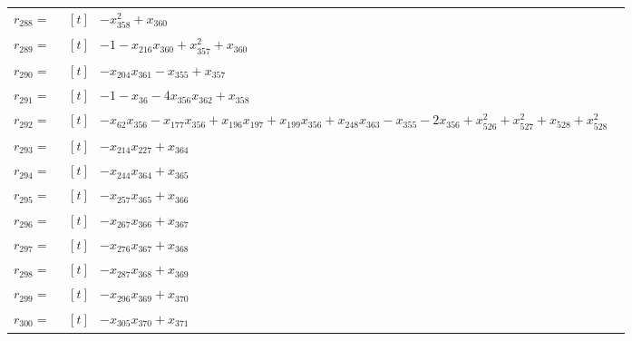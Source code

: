 \begin{longtable}{@{}r p{0.92\linewidth}@{}}
$r_{288}=$ & $\begin{aligned}[t]&-x_{358}^{2}+x_{360}\end{aligned}$ \\[2pt]
$r_{289}=$ & $\begin{aligned}[t]&-1-x_{216}x_{360}+x_{357}^{2}+x_{360}\end{aligned}$ \\[2pt]
$r_{290}=$ & $\begin{aligned}[t]&-x_{204}x_{361}-x_{355}+x_{357}\end{aligned}$ \\[2pt]
$r_{291}=$ & $\begin{aligned}[t]&-1-x_{36}-4x_{356}x_{362}+x_{358}\end{aligned}$ \\[2pt]
$r_{292}=$ & $\begin{aligned}[t]&-x_{62}x_{356}-x_{177}x_{356}+x_{196}x_{197}+x_{199}x_{356}+x_{248}x_{363}-x_{355}-2x_{356}+x_{526}^{2}+x_{527}^{2}+x_{528}+x_{528}^{2}\end{aligned}$ \\[2pt]
$r_{293}=$ & $\begin{aligned}[t]&-x_{214}x_{227}+x_{364}\end{aligned}$ \\[2pt]
$r_{294}=$ & $\begin{aligned}[t]&-x_{244}x_{364}+x_{365}\end{aligned}$ \\[2pt]
$r_{295}=$ & $\begin{aligned}[t]&-x_{257}x_{365}+x_{366}\end{aligned}$ \\[2pt]
$r_{296}=$ & $\begin{aligned}[t]&-x_{267}x_{366}+x_{367}\end{aligned}$ \\[2pt]
$r_{297}=$ & $\begin{aligned}[t]&-x_{276}x_{367}+x_{368}\end{aligned}$ \\[2pt]
$r_{298}=$ & $\begin{aligned}[t]&-x_{287}x_{368}+x_{369}\end{aligned}$ \\[2pt]
$r_{299}=$ & $\begin{aligned}[t]&-x_{296}x_{369}+x_{370}\end{aligned}$ \\[2pt]
$r_{300}=$ & $\begin{aligned}[t]&-x_{305}x_{370}+x_{371}\end{aligned}$ \\[2pt]

\end{longtable}
